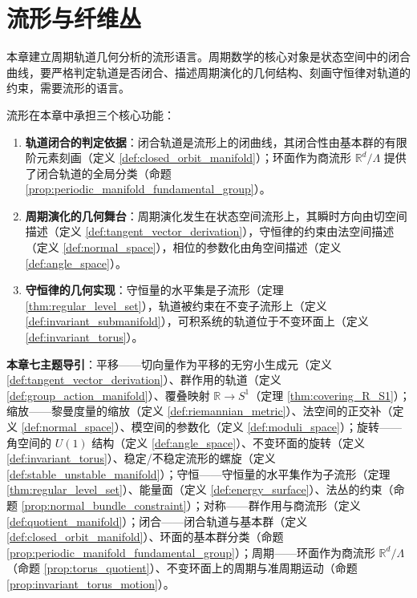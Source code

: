 \chapter{流形与纤维丛}
\label{chap:manifold}

\begin{remark}[本章定位]\label{rem:manifold_chapter_positioning}
本章建立周期轨道几何分析的流形语言。周期数学的核心对象是状态空间中的闭合曲线，要严格判定轨道是否闭合、描述周期演化的几何结构、刻画守恒律对轨道的约束，需要流形的语言。

流形在本章中承担三个核心功能：
\begin{enumerate}[label=(\arabic*)]
    \item \textbf{轨道闭合的判定依据}：闭合轨道是流形上的闭曲线，其闭合性由基本群的有限阶元素刻画（定义 \ref{def:closed_orbit_manifold}）；环面作为商流形 $\mathbb{R}^d/\Lambda$ 提供了闭合轨道的全局分类（命题 \ref{prop:periodic_manifold_fundamental_group}）。
    \item \textbf{周期演化的几何舞台}：周期演化发生在状态空间流形上，其瞬时方向由切空间描述（定义 \ref{def:tangent_vector_derivation}），守恒律的约束由法空间描述（定义 \ref{def:normal_space}），相位的参数化由角空间描述（定义 \ref{def:angle_space}）。
    \item \textbf{守恒律的几何实现}：守恒量的水平集是子流形（定理 \ref{thm:regular_level_set}），轨道被约束在不变子流形上（定义 \ref{def:invariant_submanifold}），可积系统的轨道位于不变环面上（定义 \ref{def:invariant_torus}）。
\end{enumerate}

\textbf{本章七主题导引}：平移——切向量作为平移的无穷小生成元（定义 \ref{def:tangent_vector_derivation}）、群作用的轨道（定义 \ref{def:group_action_manifold}）、覆叠映射 $\mathbb{R} \to S^1$（定理 \ref{thm:covering_R_S1}）；缩放——黎曼度量的缩放（定义 \ref{def:riemannian_metric}）、法空间的正交补（定义 \ref{def:normal_space}）、模空间的参数化（定义 \ref{def:moduli_space}）；旋转——角空间的 $U(1)$ 结构（定义 \ref{def:angle_space}）、不变环面的旋转（定义 \ref{def:invariant_torus}）、稳定/不稳定流形的螺旋（定义 \ref{def:stable_unstable_manifold}）；守恒——守恒量的水平集作为子流形（定理 \ref{thm:regular_level_set}）、能量面（定义 \ref{def:energy_surface}）、法丛的约束（命题 \ref{prop:normal_bundle_constraint}）；对称——群作用与商流形（定义 \ref{def:quotient_manifold}）；闭合——闭合轨道与基本群（定义 \ref{def:closed_orbit_manifold}）、环面的基本群分类（命题 \ref{prop:periodic_manifold_fundamental_group}）；周期——环面作为商流形 $\mathbb{R}^d/\Lambda$（命题 \ref{prop:torus_quotient}）、不变环面上的周期与准周期运动（命题 \ref{prop:invariant_torus_motion}）。
\end{remark}

